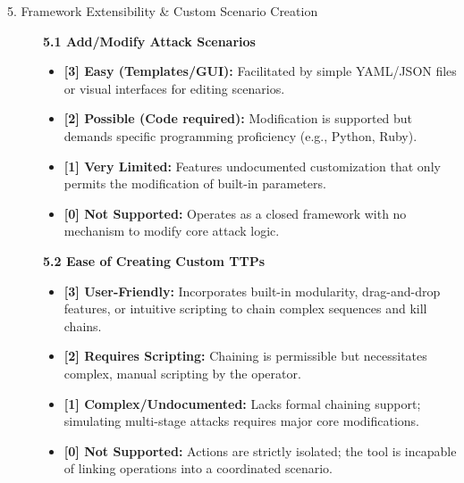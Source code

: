 \begin{description}
    \item[5. Framework Extensibility \& Custom Scenario Creation]  \hfill \par
    \textbf{5.1 Add/Modify Attack Scenarios}
    \begin{itemize}
        \item \textbf{[3] Easy (Templates/GUI):} Facilitated by simple YAML/JSON files or visual interfaces for editing scenarios.
        \item \textbf{[2] Possible (Code required):} Modification is supported but demands specific programming proficiency (e.g., Python, Ruby).
        \item \textbf{[1] Very Limited:} Features undocumented customization that only permits the modification of built-in parameters.
        \item \textbf{[0] Not Supported:} Operates as a closed framework with no mechanism to modify core attack logic.
    \end{itemize}
    \textbf{5.2 Ease of Creating Custom TTPs}
    \begin{itemize}
        \item \textbf{[3] User-Friendly:} Incorporates built-in modularity, drag-and-drop features, or intuitive scripting to chain complex sequences and kill chains.
        \item \textbf{[2] Requires Scripting:} Chaining is permissible but necessitates complex, manual scripting by the operator.
        \item \textbf{[1] Complex/Undocumented:} Lacks formal chaining support; simulating multi-stage attacks requires major core modifications.
        \item \textbf{[0] Not Supported:} Actions are strictly isolated; the tool is incapable of linking operations into a coordinated scenario.
    \end{itemize}


\end{description}
